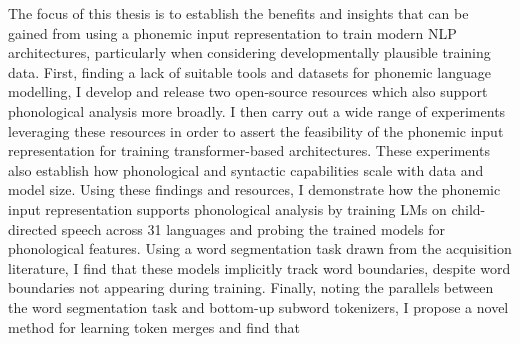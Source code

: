 



The focus of this thesis is to establish the benefits and insights that can be gained from using a phonemic input representation to train modern NLP architectures, particularly when considering developmentally plausible training data. First, finding a lack of suitable tools and datasets for phonemic language modelling, I develop and release two open-source resources which also support phonological analysis more broadly. I then carry out a wide range of experiments leveraging these resources in order to assert the feasibility of the phonemic input representation for training transformer-based architectures. These experiments also establish how phonological and syntactic capabilities scale with data and model size. Using these findings and resources, I demonstrate how the phonemic input representation supports phonological analysis by training LMs on child-directed speech across 31 languages and probing the trained models for phonological features. Using a word segmentation task drawn from the acquisition literature, I find that these models implicitly track word boundaries, despite word boundaries not appearing during training. Finally, noting the parallels between the word segmentation task and bottom-up subword tokenizers, I propose a novel method for learning token merges and find that \writemore


